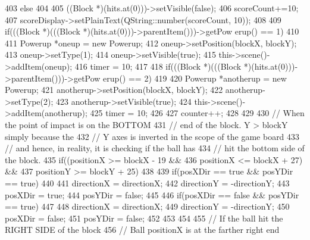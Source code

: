 \begin{DoxyCode}
{{{{403                 else
404                 {
405                     ((Block *)(hits.at(0)))->setVisible(false);
406                     scoreCount+=10;
407                     scoreDisplay->setPlainText(QString::number(scoreCount, 10));
408 
409                     if(((Block *)(((Block *)(hits.at(0)))->parentItem()))->getPow
      erup() == 1)
410                     {                        
411                         Powerup *oneup = new Powerup;
412                         oneup->setPosition(blockX, blockY);
413                         oneup->setType(1);
414                         oneup->setVisible(true);
415                         this->scene()->addItem(oneup);
416                         timer = 10;
417                     }
418                     if(((Block *)(((Block *)(hits.at(0)))->parentItem()))->getPow
      erup() == 2)
419                     {
420                         Powerup *anotherup = new Powerup;
421                         anotherup->setPosition(blockX, blockY);
422                         anotherup->setType(2);
423                         anotherup->setVisible(true);
424                         this->scene()->addItem(anotherup);
425                         timer = 10;
426                     }
427                     counter++;
428                 }
429                                 
430                 // When the point of impact is on the BOTTOM
431                 // end of the block. Y > blockY simply because the
432                 // Y axes is inverted in the scope of the game board
433                 // and hence, in reality, it is checking if the ball has
434                 // hit the bottom side of the block.
435                 if((positionX >= blockX - 19 &&
436                     positionX <= blockX + 27) &&
437                    positionY >= blockY + 25)
438                 {
439                     if(posXDir == true && posYDir == true)
440                     {
441                         directionX = directionX;
442                         directionY = -directionY;
443                         posXDir = true;
444                         posYDir = false;
445                     }
446                     if(posXDir == false && posYDir == true)
447                     {
448                         directionX = directionX;
449                         directionY = -directionY;
450                         posXDir = false;
451                         posYDir = false;
452                     }
453 
454                 }
455                 // If the ball hit the RIGHT SIDE of the block
456                 // Ball positionX is at the farther right end
}}}}
\end{DoxyCode}
